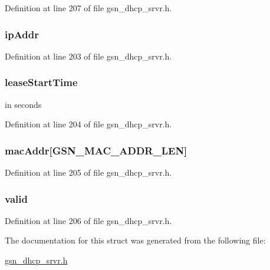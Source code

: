 Definition at line 207 of file gsn\_\-dhcp\_\-srvr.h.

\hypertarget{a00045_a48e99cad0feadbd616a0cda7d9628826}{
\subsubsection[{ipAddr}]{ {\bf ipAddr}}}
\label{a00045_a48e99cad0feadbd616a0cda7d9628826}


Definition at line 203 of file gsn\_\-dhcp\_\-srvr.h.

\hypertarget{a00045_a4de829383750c189b8e50b611b831e23}{
\subsubsection[{leaseStartTime}]{ {\bf leaseStartTime}}}
\label{a00045_a4de829383750c189b8e50b611b831e23}
in seconds 

Definition at line 204 of file gsn\_\-dhcp\_\-srvr.h.

\hypertarget{a00045_a6512d982e0937ad5254ef8aba102e15d}{
\subsubsection[{macAddr}]{ {\bf macAddr}\mbox{[}GSN\_\-MAC\_\-ADDR\_\-LEN\mbox{]}}}
\label{a00045_a6512d982e0937ad5254ef8aba102e15d}


Definition at line 205 of file gsn\_\-dhcp\_\-srvr.h.

\hypertarget{a00045_a48e686c4b5c33a687c40091bb69ae180}{
\subsubsection[{valid}]{ {\bf valid}}}
\label{a00045_a48e686c4b5c33a687c40091bb69ae180}


Definition at line 206 of file gsn\_\-dhcp\_\-srvr.h.



The documentation for this struct was generated from the following file:\begin{DoxyCompactItemize}
\item 
\hyperlink{a00482}{gsn\_\-dhcp\_\-srvr.h}\end{DoxyCompactItemize}
